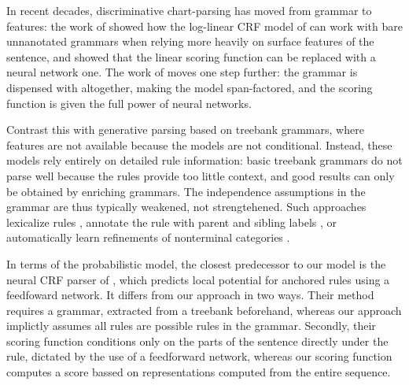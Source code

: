   In recent decades, discriminative chart-parsing has moved from grammar to features: the work of \citet{hall2014less} showed how the log-linear CRF model of \cite{finkel2008crf} can work with bare unnanotated grammars when relying more heavily on surface features of the sentence, and \citet{klein2015crf} showed that the linear scoring function can be replaced with a neural network one. The work of \citep{stern2017minimal} moves one step further: the grammar is dispensed with altogether, making the model span-factored, and the scoring function is given the full power of neural networks.

  Contrast this with generative parsing based on treebank grammars, where features are not available because the models are not conditional. Instead, these models rely entirely on detailed rule information: basic treebank grammars do not parse well because the rules provide too little context, and good results can only be obtained by enriching grammars. The independence assumptions in the grammar are thus typically weakened, not strengtehened. Such approaches lexicalize rules \citep{collins2003head}, annotate the rule with parent and sibling labels \citep{klein2003accurate}, or automatically learn refinements of nonterminal categories \citep{petrov2006learning}.

  In terms of the probabilistic model, the closest predecessor to our model is the neural CRF parser of \citet{klein2015crf}, which predicts local potential for anchored rules using a feedfoward network. It differs from our approach in two ways. Their method requires a grammar, extracted from a treebank beforehand, whereas our approach implictly assumes all rules are possible rules in the grammar. Secondly, their scoring function conditions only on the parts of the sentence directly under the rule, dictated by the use of a feedforward network, whereas our scoring function computes a score bassed on representations computed from the entire sequence.


